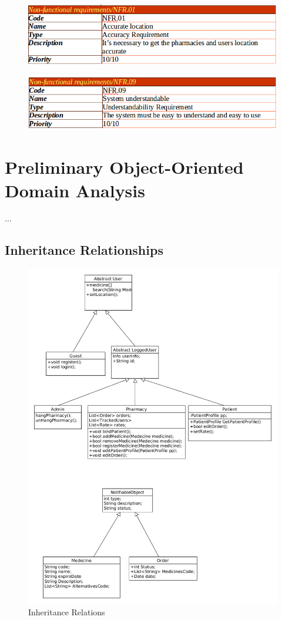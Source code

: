 \documentclass[]{article}
\begin{document}
\begin{figure}[H]
\centering
\includegraphics[scale=0.4]{./nonf/10}
\end{figure}

\begin{figure}[H]
\centering
\includegraphics[scale=0.4]{./nonf/11}
\end{figure}


\section{Preliminary Object-Oriented Domain Analysis}
...
\subsection{Inheritance Relationships}
\begin{figure}[H]
\centering
\includegraphics[scale=0.4]{./classdiagram/InhertanceRelations}
\caption{Inheritance Relations}
\end{figure}
\end{document}

